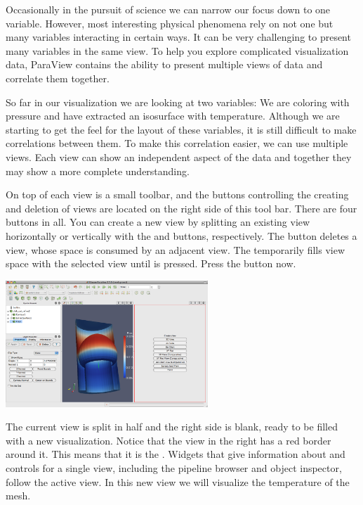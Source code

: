 Occasionally in the pursuit of science we can narrow our focus down to one
variable.  However, most interesting physical phenomena rely on not one but
many variables interacting in certain ways.  It can be very challenging to
present many variables in the same view.  To help you explore complicated
visualization data, ParaView contains the ability to present multiple views
of data and correlate them together.

So far in our visualization we are looking at two variables: We are
coloring with pressure and have extracted an isosurface with temperature.
Although we are starting to get the feel for the layout of these variables,
it is still difficult to make correlations between them.  To make this
correlation easier, we can use multiple views.  Each view can show an
independent aspect of the data and together they may show a more complete
understanding.

On top of each view is a small toolbar, and the buttons controlling the
creating and deletion of views are located on the right side of this tool
bar.  There are four buttons in all.  You can create a new view by
splitting an existing view horizontally or vertically with the \splitViewH
and \splitViewV buttons, respectively.  The \deleteView button deletes a
view, whose space is consumed by an adjacent view.  The \maximizeView
temporarily fills view space with the selected view until \restoreView is
pressed.  Press the \splitViewH button now.

\begin{inlinefig}
  \includegraphics[width=3in]{images/SplitView1}
\end{inlinefig}

The current view is split in half and the right side is blank, ready to be
filled with a new visualization.  Notice that the view in the right has a
red border around it.  This means that it is the .
Widgets that give information about and controls for a single view,
including the pipeline browser and object inspector, follow the active
view.  In this new view we will visualize the temperature of the mesh.

